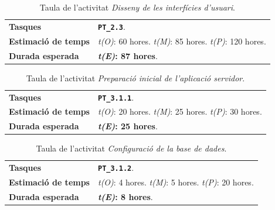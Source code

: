 \documentclass[a4paper,12pt]{ThesisStyle}
\begin{document}
\begin{table}[H]
  \begin{tabularx}{\textwidth}{l | X}
    \toprule
    \rowcolor{Green}
    \multicolumn{2}{c}{\texttt{\textbf{A5:}} Disseny de les interfícies d'usuari}\\
    \midrule[0.9pt]
    \textbf{Tasques}                 & \texttt{\textbf{PT\_2.3}}.\\
    \midrule
    \textbf{Estimació de temps}      & \textit{t(O)}: 60 hores.
    \newline \textit{t(M)}: 85 hores.
    \newline \textit{t(P)}: 120 hores.\\
    \midrule
    \textbf{Durada esperada}         & \textbf{\textit{t(E)}: 87 hores}.\\
    \bottomrule
  \end{tabularx}
  \caption{\label{taula:a5} Taula de l'activitat \emph{Disseny de les interfícies d'usuari}.}
\end{table}

\begin{table}[H]
  \begin{tabularx}{\textwidth}{l | X}
    \toprule
    \rowcolor{Blue}
    \multicolumn{2}{c}{\texttt{\textbf{A6:}} Preparació inicial de l'aplicació servidor}\\
    \midrule[0.9pt]
    \textbf{Tasques}                 & \texttt{\textbf{PT\_3.1.1}}.\\
    \midrule
    \textbf{Estimació de temps}      & \textit{t(O)}: 20 hores.
    \newline \textit{t(M)}: 25 hores.
    \newline \textit{t(P)}: 30 hores.\\
    \midrule
    \textbf{Durada esperada}         & \textbf{\textit{t(E)}: 25 hores}.\\
    \bottomrule
  \end{tabularx}
  \caption{\label{taula:a6} Taula de l'activitat \emph{Preparació inicial de l'aplicació servidor}.}
\end{table}

\begin{table}[H]
  \begin{tabularx}{\textwidth}{l | X}
    \toprule
    \rowcolor{Blue}
    \multicolumn{2}{c}{\texttt{\textbf{A7:}} Configuració de la base de dades}\\
    \midrule[0.9pt]
    \textbf{Tasques}                 & \texttt{\textbf{PT\_3.1.2}}.\\
    \midrule
    \textbf{Estimació de temps}      & \textit{t(O)}: 4 hores.
    \newline \textit{t(M)}: 5 hores.
    \newline \textit{t(P)}: 20 hores.\\
    \midrule
    \textbf{Durada esperada}         & \textbf{\textit{t(E)}: 8 hores}.\\
    \bottomrule
  \end{tabularx}
  \caption{\label{taula:a7} Taula de l'activitat \emph{Configuració de la base de dades}.}
\end{table}
\end{document}
